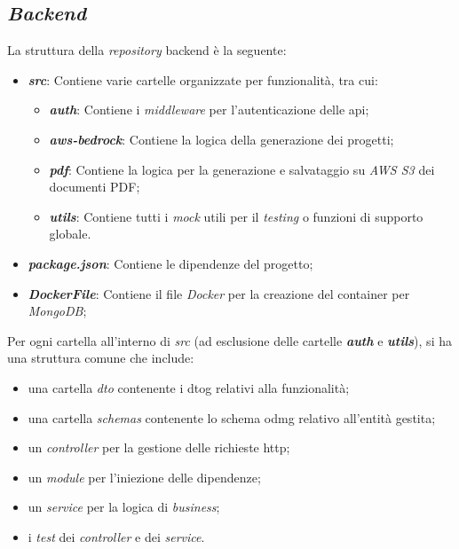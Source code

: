 \subsection{\textit{Backend}}
\label{sez:backend}

La struttura della \textit{repository} \gls{backend} è la seguente:

\begin{itemize}
    \item \textbf{\textit{src}}: Contiene varie cartelle organizzate per funzionalità, tra cui:
    \begin{itemize}
        \item \textbf{\textit{auth}}: Contiene i \textit{middleware} per l'autenticazione delle \gls{api};
        \item \textbf{\textit{aws-bedrock}}: Contiene la logica della generazione dei progetti;
        \item \textbf{\textit{pdf}}: Contiene la logica per la generazione e salvataggio su \textit{AWS S3} dei documenti PDF;
        \item \textbf{\textit{utils}}: Contiene tutti i \textit{mock} utili per il \textit{testing} o funzioni di supporto globale.
    \end{itemize}
    \item \textbf{\textit{package.json}}: Contiene le dipendenze del progetto;
    \item \textbf{\textit{DockerFile}}: Contiene il file \textit{Docker} per la creazione del \gls{container} per \textit{MongoDB};
\end{itemize}

\noindent Per ogni cartella all'interno di \textit{src} (ad esclusione delle cartelle \textbf{\textit{auth}} e \textbf{\textit{utils}}), si ha una struttura comune che include:
\begin{itemize} 
    \item una cartella \textit{dto} contenente i \gls{dtog} relativi alla funzionalità;
    \item una cartella \textit{schemas} contenente lo schema \gls{odmg} relativo all'entità gestita;
    \item un \textit{controller} per la gestione delle richieste \gls{http};
    \item un \textit{module} per l'iniezione delle dipendenze;
    \item un \textit{service} per la logica di \textit{business};
    \item i \textit{test} dei \textit{controller} e dei \textit{service}.
\end{itemize}

